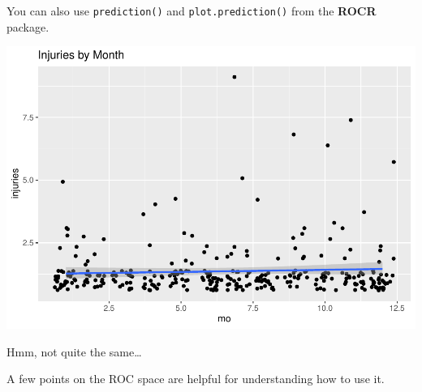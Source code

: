 \documentclass[
]{book}
\newenvironment{Shaded}{\begin{snugshade}}{\end{snugshade}}
\newcommand{\DataTypeTok}[1]{\textcolor[rgb]{0.13,0.29,0.53}{#1}}
\newcommand{\DecValTok}[1]{\textcolor[rgb]{0.00,0.00,0.81}{#1}}
\newcommand{\KeywordTok}[1]{\textcolor[rgb]{0.13,0.29,0.53}{\textbf{#1}}}
\newcommand{\NormalTok}[1]{#1}
\newcommand{\OperatorTok}[1]{\textcolor[rgb]{0.81,0.36,0.00}{\textbf{#1}}}
\newcommand{\StringTok}[1]{\textcolor[rgb]{0.31,0.60,0.02}{#1}}
\begin{document}
You can also use \texttt{prediction()} and \texttt{plot.prediction()} from the \textbf{ROCR} package.

\begin{Shaded}
\end{Shaded}

\includegraphics{data-sci_files/figure-latex/unnamed-chunk-48-1.pdf}

Hmm, not quite the same\ldots{}

A few points on the ROC space are helpful for understanding how to use it.
\end{document}
